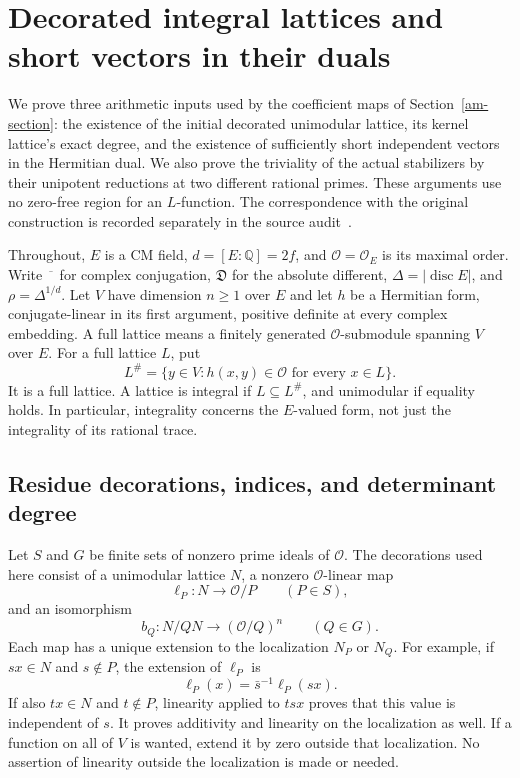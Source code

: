 \section{Decorated integral lattices and short vectors in their duals}
\label{al-section}

We prove three arithmetic inputs used by the coefficient maps of
Section~\ref{am-section}: the existence of the initial decorated
unimodular lattice, its kernel lattice's exact degree, and the existence
of sufficiently short independent vectors in the Hermitian dual.
We also prove the triviality of the actual stabilizers by their
unipotent reductions at two different rational primes.
These arguments use no zero-free region for an $L$-function.
The correspondence with the original construction is recorded
separately in the source audit~\cite{alpo-uniform-source}.

Throughout, $E$ is a CM field, $d=[E:\mathbb Q]=2f$, and
$\mathcal O=\mathcal O_E$ is its maximal order. Write
$\overline{\phantom{x}}$ for complex conjugation,
$\mathfrak D$ for the absolute different,
$\Delta=|\operatorname{disc}E|$, and $\rho=\Delta^{1/d}$.
Let $V$ have dimension $n\geq1$ over $E$ and let $h$ be a
Hermitian form, conjugate-linear in its first argument, positive
definite at every complex embedding. A full lattice means a
finitely generated $\mathcal O$-submodule spanning $V$ over $E$.
For a full lattice $L$, put
\[
 L^\#=\{y\in V:h(x,y)\in\mathcal O\text{ for every }x\in L\}.
\]
It is a full lattice. A lattice is integral if $L\subseteq L^\#$,
and unimodular if equality holds. In particular, integrality concerns
the $E$-valued form, not just the integrality of its rational trace.

\subsection{Residue decorations, indices, and determinant degree}

Let $S$ and $G$ be finite sets of nonzero prime ideals of $\mathcal O$.
The decorations used here consist of a unimodular lattice $N$, a
nonzero $\mathcal O$-linear map
\[
       \ell_P:N\longrightarrow\mathcal O/P\qquad(P\in S),
\]
and an isomorphism
\[
       b_Q:N/QN\longrightarrow(\mathcal O/Q)^n\qquad(Q\in G).
\]
Each map has a unique extension to the localization $N_P$ or $N_Q$.
For example, if $sx\in N$ and $s\notin P$, the extension of
$\ell_P$ is
\begin{equation}\label{al-extension}
                 \ell_P(x)=\bar s^{-1}\ell_P(sx).
\end{equation}
If also $tx\in N$ and $t\notin P$, linearity applied to
$tsx$ proves that this value is independent of $s$.
It proves additivity and linearity on the localization as well.
If a function on all of $V$ is wanted, extend it by zero outside
that localization. No assertion of linearity outside the localization
is made or needed.

